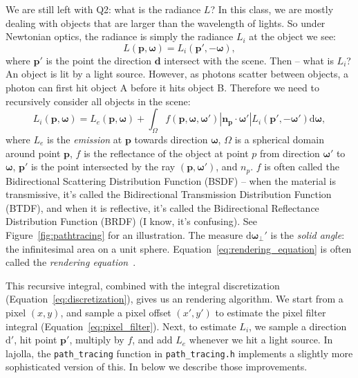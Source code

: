 \documentclass{article}
\begin{document}
We are still left with Q2: what is the radiance $L$? In this class, we are mostly dealing with objects that are larger than the wavelength of lights. So under Newtonian optics, the radiance is simply the radiance $L_i$ at the object we see:
\begin{equation}
    L(\mathbf{p}, \mathbf{\omega}) = L_i(\mathbf{p}', -\mathbf{\omega}),
\end{equation}
where $\mathbf{p}'$ is the point the direction $\mathbf{d}$ intersect with the scene. Then -- what is $L_i$? An object is lit by a light source. However, as photons scatter between objects, a photon can first hit object A before it hits object B. Therefore we need to recursively consider all objects in the scene:
\begin{equation}
    L_i(\mathbf{p}, \mathbf{\omega}) = L_e(\mathbf{p}, \mathbf{\omega}) + \int_{\Omega} f(\mathbf{p}, \mathbf{\omega}, \mathbf{\omega}') |\mathbf{n}_{\mathbf{p}} \cdot \mathbf{\omega}'| L_i(\mathbf{p}', -\mathbf{\omega}') \mathrm{d} \mathbf{\omega},
    \label{eq:rendering_equation}
\end{equation}
where $L_e$ is the \emph{emission} at $\mathbf{p}$ towards direction $\mathbf{\omega}$, $\Omega$ is a spherical domain around point $\mathbf{p}$, $f$ is the reflectance of the object at point $p$ from direction $\mathbf{\omega}'$ to $\mathbf{\omega}$, $\mathbf{p}'$ is the point intersected by the ray $(\mathbf{p}, \mathbf{\omega}')$, and $n_{p}$. $f$ is often called the Bidirectional Scattering Distribution Function (BSDF) -- when the material is transmissive, it's called the Bidirectional Transmission Distribution Function (BTDF), and when it is reflective, it's called the Bidirectional Reflectance Distribution Function (BRDF) (I know, it's confusing). See Figure~\ref{fig:pathtracing} for an illustration. The measure $\mathrm{d} \mathbf{\omega}_{\bot}'$ is the \emph{solid angle}: the infinitesimal area on a unit sphere. Equation~\ref{eq:rendering_equation} is often called the \emph{rendering equation}~\cite{Kajiya:1986:RE}.

This recursive integral, combined with the integral discretization (Equation~\ref{eq:discretization}), gives us an rendering algorithm. We start from a pixel $(x, y)$, and sample a pixel offset $(x', y')$ to estimate the pixel filter integral (Equation~\ref{eq:pixel_filter}). Next, to estimate $L_i$, we sample a direction $\mathrm{d}'$, hit point $\mathbf{p}'$, multiply by $f$, and add $L_e$ whenever we hit a light source. In lajolla, the \lstinline{path_tracing} function in \lstinline{path_tracing.h} implements a slightly more sophisticated version of this. In below we describe those improvements.
\end{document}
